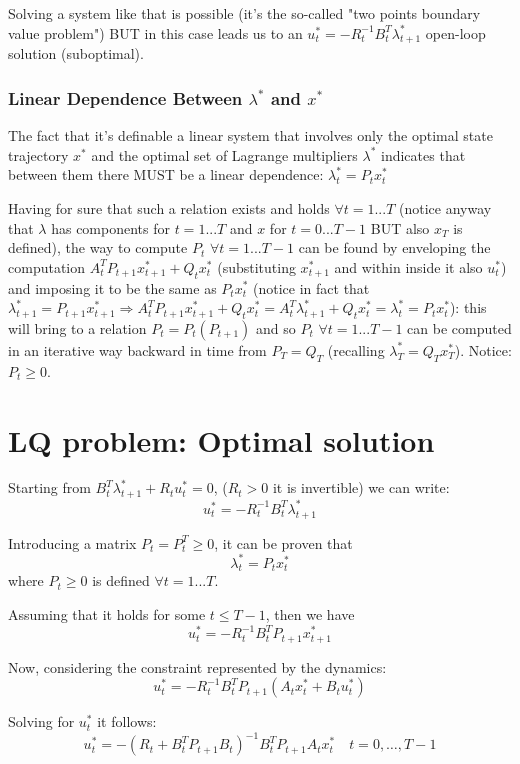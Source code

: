 \documentclass[openany]{book}
\theoremstyle{definition}
\theoremstyle{remark}
\begin{document}
Solving a system like that is possible (it's the so-called "two points boundary value problem") BUT in this case leads us to an $u_t^* = -R_t^{-1}B_t^T\lambda_{t+1}^*$ open-loop solution (suboptimal).

\subsubsection{Linear Dependence Between \texorpdfstring{$\lambda^*$}{λ*} and \texorpdfstring{$x^*$}{x*}}

The fact that it's definable a linear system that involves only the optimal state trajectory $x^*$ and the optimal set of Lagrange multipliers $\lambda^*$ indicates that between them there MUST be a linear dependence: $\lambda_t^* = P_tx_t^*$

Having for sure that such a relation exists and holds $\forall t=1...T$ (notice anyway that $\lambda$ has components for $t=1...T$ and $x$ for $t=0...T-1$ BUT also $x_T$ is defined), the way to compute $P_t$ $\forall t=1...T-1$ can be found by enveloping the computation $A_t^TP_{t+1}x_{t+1}^* + Q_tx_t^*$ (substituting $x_{t+1}^*$ and within inside it also $u_t^*$) and imposing it to be the same as $P_tx_t^*$ (notice in fact that $\lambda_{t+1}^* = P_{t+1}x_{t+1}^* \Rightarrow A_t^TP_{t+1}x_{t+1}^* + Q_tx_t^* = A_t^T\lambda_{t+1}^* + Q_tx_t^* = \lambda_t^* = P_tx_t^*$): this will bring to a relation $P_t = P_t(P_{t+1})$ and so $P_t$ $\forall t=1...T-1$ can be computed in an iterative way backward in time from $P_T = Q_T$ (recalling $\lambda_T^* = Q_Tx_T^*$). Notice: $P_t \geq 0$.

\section{LQ problem: Optimal solution}

Starting from $B_t^T\lambda_{t+1}^* + R_tu_t^* = 0$, ($R_t>0$ it is invertible) we can write:
\[
    u_t^* = -R_t^{-1}B_t^T\lambda_{t+1}^*
\]

Introducing a matrix $P_t = P_t^T \geq 0$, it can be proven that
\[
    \lambda_t^* = P_tx_t^*
\]
where $P_t \geq 0$ is defined $\forall t=1...T$.

Assuming that it holds for some $t \leq T-1$, then we have
\[
    u_t^* = -R_t^{-1}B_t^TP_{t+1}x_{t+1}^*
\]

Now, considering the constraint represented by the dynamics:
\[
    u_t^* = -R_t^{-1}B_t^TP_{t+1}(A_tx_t^* + B_tu_t^*)
\]

Solving for $u_t^*$ it follows:
\[
    u_t^* = -(R_t + B_t^TP_{t+1}B_t)^{-1}B_t^TP_{t+1}A_tx_t^* \quad t = 0,\ldots,T-1
\]
\end{document}
